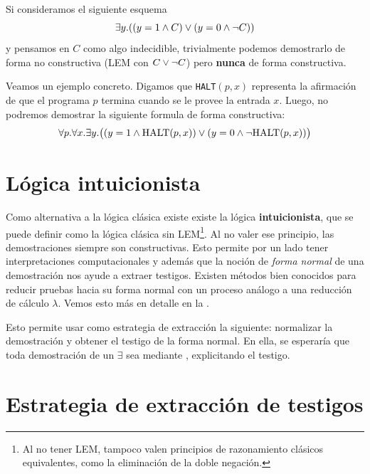 \begin{ejemplo}
    Si consideramos el siguiente esquema
    \[
        \exists y . ((y = 1 \wedge C) \vee (y = 0 \wedge \neg C))
    \]
    y pensamos en $C$ como algo indecidible, trivialmente podemos demostrarlo de
    forma no constructiva (LEM con $C \vee \neg C$) pero \textbf{nunca} de
    forma constructiva.

    Veamos un ejemplo concreto. Digamos que \texttt{HALT}$(p ,x)$ representa la afirmación de que el programa $p$ termina cuando se le provee la entrada $x$. Luego, no podremos demostrar la siguiente formula de forma constructiva:
    \[
        \forall p . \forall x . \exists y .
        \big(
            (y = 1 \wedge \textrm{HALT}(p, x))
            \vee
            (y = 0 \wedge \neg \textrm{HALT}(p, x))
        \big)
    \]
\end{ejemplo}

\section{Lógica intuicionista}

Como alternativa a la lógica clásica existe existe la lógica
\textbf{intuicionista}, que se puede definir como la lógica clásica sin
LEM\footnote{Al no tener LEM, tampoco valen principios de razonamiento clásicos
equivalentes, como la eliminación de la doble negación.}. Al no valer ese
principio, las demostraciones siempre son constructivas. Esto permite por un
lado tener interpretaciones computacionales y además que
la noción de \textit{forma normal} de una demostración nos ayude a extraer testigos. Existen métodos
bien conocidos para reducir pruebas hacia su forma normal con un proceso análogo
a una reducción de cálculo $\lambda$. Vemos esto más en detalle en la .

Esto permite usar como estrategia de extracción la siguiente: normalizar la
demostración y obtener el testigo de la forma normal. En ella, se esperaría que
toda demostración de un $\exists$ sea mediante , explicitando el
testigo.

\section{Estrategia de extracción de testigos}

